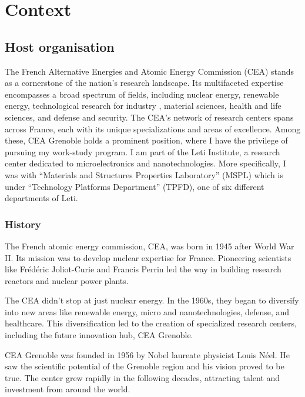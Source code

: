 \section{Context}
\subsection{Host organisation}

\medskip

The French Alternative Energies and Atomic Energy Commission (CEA) stands as a cornerstone
of the nation's research landscape. Its multifaceted expertise encompasses a broad spectrum
of fields, including nuclear energy, renewable energy, technological research for industry
, material sciences, health and life sciences, and defense and security. The CEA's network
of research centers spans across France, each with its unique specializations and areas
of excellence. Among these, CEA Grenoble holds a prominent position, where I have the 
privilege of pursuing my work-study program. I am part of the Leti Institute,
a research center dedicated to microelectronics and nanotechnologies. More specifically, 
I was with “Materials and Structures Properties Laboratory” (MSPL) which is under “Technology Platforms 
Department” (TPFD), one of six different departments of Leti.

\medskip

\subsubsection{History}

\medskip

The French atomic energy commission, CEA, was born in 1945 after World War II.  Its mission was to develop nuclear 
expertise for France.  Pioneering scientists like Frédéric Joliot-Curie and Francis Perrin led the way in building 
research reactors and nuclear power plants.

\medskip

The CEA didn't stop at just nuclear energy.  In the 1960s, they began to diversify into new areas like renewable energy,
 micro and nanotechnologies, defense, and healthcare.  This diversification led to the creation of specialized research
  centers, including the future innovation hub, CEA Grenoble.

\medskip

CEA Grenoble was founded in 1956 by Nobel laureate physicist Louis Néel.  He saw the scientific potential of the Grenoble
region and his vision proved to be true.  The center grew rapidly in the following decades, attracting talent and investment
from around the world.

